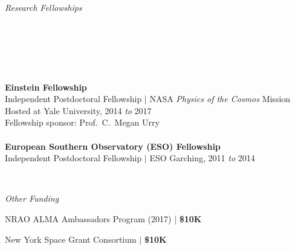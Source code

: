 \documentclass[11pt]{article}
\begin{document}
\vspace{6mm}


\hspace{2.5mm} \parbox{1.5in}{{\it Research Fellowships \\ \\ \\ \\ \\ \\}} \parbox{5.15in}{{\bf Einstein Fellowship} \\ Independent Postdoctoral Fellowship $|$ NASA {\it Physics of the Cosmos} Mission
\\ Hosted at Yale University, 2014 {\it to} 2017 
\\ Fellowship sponsor: Prof.~C.~Megan Urry 
\\ \\ {\bf European Southern Observatory (ESO) Fellowship} \\ Independent Postdoctoral Fellowship $|$ ESO Garching, 2011 {\it to} 2014} \\

\vspace{6mm}

\hspace{2.5mm} \parbox{1.5in}{{\it Other Funding \\}}
\parbox{5.15in}{NRAO ALMA Ambassadors Program (2017) $|$ {\bf \$10K} 

New York Space Grant Consortium $|$ {\bf \$10K}
}



\vspace{6mm}
\end{document}
